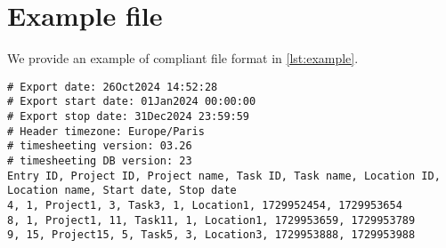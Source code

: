 \section{Example file} \label{sec:example}
We provide an example of compliant file format in \cref{lst:example}.

\begin{minipage}{\linewidth}
\begin{lstlisting}[caption={Compliant exported timesheet file.},
                   label={lst:example}]
# Export date: 26Oct2024 14:52:28
# Export start date: 01Jan2024 00:00:00
# Export stop date: 31Dec2024 23:59:59
# Header timezone: Europe/Paris
# timesheeting version: 03.26
# timesheeting DB version: 23
Entry ID, Project ID, Project name, Task ID, Task name, Location ID, Location name, Start date, Stop date
4, 1, Project1, 3, Task3, 1, Location1, 1729952454, 1729953654
8, 1, Project1, 11, Task11, 1, Location1, 1729953659, 1729953789
9, 15, Project15, 5, Task5, 3, Location3, 1729953888, 1729953988
\end{lstlisting} \end{minipage}
